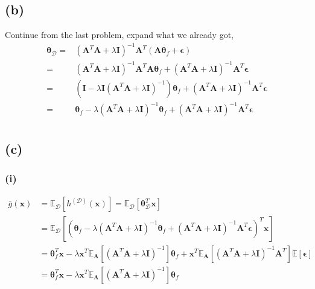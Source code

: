\documentclass[11pt]{article}
\begin{document}
\subsection*{(b)}
Continue from the last problem, expand what we already got,
\begin{equation}
\begin{split}
\pmb{\theta}_{\mathcal{D}}=& (\pmb{A}^T\pmb{A}+\lambda\pmb{I})^{-1}\pmb{A}^T(\pmb{A}\pmb{\theta}_f+\pmb{\epsilon})\\
=&(\pmb{A}^T\pmb{A}+\lambda\pmb{I})^{-1}\pmb{A}^T\pmb{A}\pmb{\theta}_f + (\pmb{A}^T\pmb{A}+\lambda\pmb{I})^{-1}\pmb{A}^T\pmb{\epsilon}\\
=&(\pmb{I}-\lambda\pmb{I}(\pmb{A}^T\pmb{A}+\lambda\pmb{I})^{-1})\pmb{\theta}_f + (\pmb{A}^T\pmb{A}+\lambda\pmb{I})^{-1}\pmb{A}^T\pmb{\epsilon}\\
=&\pmb{\theta}_f-\lambda(\pmb{A}^T\pmb{A}+\lambda\pmb{I})^{-1}\pmb{\theta}_f + (\pmb{A}^T\pmb{A}+\lambda\pmb{I})^{-1}\pmb{A}^T\pmb{\epsilon}\\
\end{split}
\end{equation}
\subsection*{(c)}
\subsubsection*{(i)}
\begin{equation}
\begin{split}
\bar{g}(\pmb{x}) &= \mathbb{E}_{\mathcal{D}}\left[h^{(\mathcal{D})}(\pmb{x})\right]=\mathbb{E}_{\mathcal{D}}\left[\pmb{\theta}_{\mathcal{D}}^T\pmb{x}\right]\\
&=\mathbb{E}_{\mathcal{D}}\left[\left(\pmb{\theta}_f-\lambda(\pmb{A}^T\pmb{A}+\lambda\pmb{I})^{-1}\pmb{\theta}_f + (\pmb{A}^T\pmb{A}+\lambda\pmb{I})^{-1}\pmb{A}^T\pmb{\epsilon}\right)^T\pmb{x}\right]\\
&=\pmb{\theta}_f^T\pmb{x}-\lambda\pmb{x}^T\mathbb{E}_{\pmb{A}}[(\pmb{A}^T\pmb{A}+\lambda\pmb{I})^{-1}]\pmb{\theta}_f+\pmb{x}^T\mathbb{E}_{\pmb{A}}[(\pmb{A}^T\pmb{A}+\lambda\pmb{I})^{-1}\pmb{A}^T]\mathbb{E}\left[\pmb{\epsilon}\right]\\
&=\pmb{\theta}_f^T\pmb{x}-\lambda\pmb{x}^T\mathbb{E}_{\pmb{A}}[(\pmb{A}^T\pmb{A}+\lambda\pmb{I})^{-1}]\pmb{\theta}_f
\end{split}
\end{equation}
\end{document}
